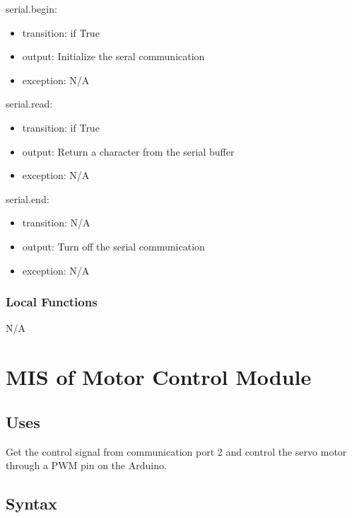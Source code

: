 \documentclass[12pt, titlepage]{article}
\begin{document}
\noindent serial.begin:
\begin{itemize}
\item transition: if True  
\item output: Initialize the seral communication
\item exception: N/A 
\end{itemize}

\noindent serial.read:
\begin{itemize}
\item transition: if True  
\item output: Return a character from the serial buffer
\item exception: N/A 
\end{itemize}

\noindent serial.end:
\begin{itemize}
\item transition: N/A
\item output: Turn off the serial communication  
\item exception: N/A 
\end{itemize}


\subsubsection{Local Functions}

N/A


\newpage

\section{MIS of Motor Control Module} 



\subsection{Uses}
Get the control signal from communication port 2 and control the servo motor through a PWM pin on the Arduino.

\subsection{Syntax}
\end{document}
